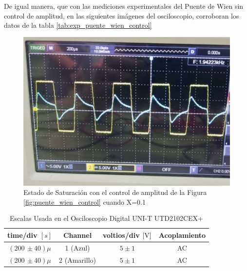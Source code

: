             De igual manera, que con las mediciones experimentales del Puente de Wien sin control de amplitud, en las siguientes imágenes del osciloscopio, corroboran los datos de la tabla \ref{tab:exp_puente_wien_control} 
            
            \begin{figure}[H]
                \centering
                \renewcommand{\figurename}{Imagen}
                \includegraphics[width=15cm]{Imagenes/exp_puente_wien_control0.png}
                \caption{Estado de Saturación con el control de amplitud de la Figura \ref{fig:puente_wien_control} cuando X=0.1}
                \label{fig:exp_puente_wien_control0}
            \end{figure}

            \begin{table}[H]
                \centering
                \begin{tabular}{|c|c|c|c|}
                    \hline
                    \textbf{time/div} $[s]$ & \textbf{Channel} & \textbf{voltios/div $[\volt]$} & \textbf{Acoplamiento} \\ \hline
                    $(200 \, \pm 40) \mu  $ & 1 (Azul)  &   $5 \pm 1 $ & AC \\ \hline  
                    $(200 \, \pm 40) \mu  $ & 2 (Amarillo)  &   $5 \pm 1 $ & AC \\ \hline   
                \end{tabular}
                \caption{Escalas Usada en el Osciloscopio Digital UNI-T UTD2102CEX+}
                \label{tab:escala_puente_wien_control0}
            \end{table}
            

